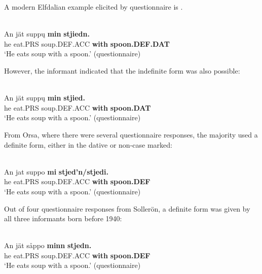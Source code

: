 \z

A modern Elfdalian example elicited by questionnaire is .


\ea \label{} 
\\
\gll An  jät  supp\k{u}  \textbf{min} \textbf{  stjiedn.}\\
he  eat.PRS  soup.DEF.ACC  \textbf{with} \textbf{spoon.DEF.DAT}\\
\glt ‘He eats soup with a spoon.’ (questionnaire)

\z

However, the informant indicated that the indefinite form was also possible:


\ea \label{} 
\\
\gll An  jät  supp\k{u}  \textbf{min} \textbf{  stjied.}\\
he  eat.PRS  soup.DEF.ACC  \textbf{with} \textbf{spoon.DAT}\\
\glt ‘He eats soup with a spoon.’ (questionnaire)

\z

From Orsa, where there were several questionnaire responses, the majority used a definite form, either in the dative or non-case marked:


\ea \label{} 
\\
\gll An  jat  suppo  \textbf{mi} \textbf{  stjed’n/stjedi.}\\
he  eat.PRS  soup.DEF.ACC  \textbf{with} \textbf{spoon.DEF}\\
\glt ‘He eats soup with a spoon.’ (questionnaire)

\z

Out of four questionnaire responses from Sollerön, a definite form was given by all three informants born before 1940:


\ea \label{} 
\\
\gll An  jät  såppo  \textbf{minn} \textbf{  stjedn.} \\
he  eat.PRS  soup.DEF.ACC  \textbf{with} \textbf{spoon.DEF} \\
\glt ‘He eats soup with a spoon.’ (questionnaire)

